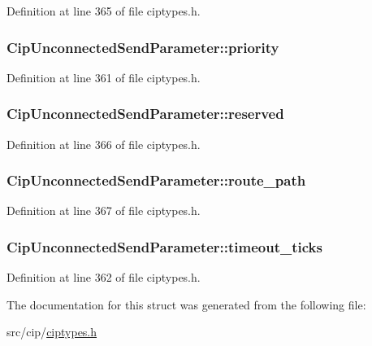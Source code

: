 \-Definition at line 365 of file ciptypes.\-h.

\hypertarget{structCipUnconnectedSendParameter_aea90d5467415fb3f6996449c87834b89}{
\subsubsection[{priority}]{ {\bf \-Cip\-Unconnected\-Send\-Parameter\-::priority}}}\label{de/dcb/structCipUnconnectedSendParameter_aea90d5467415fb3f6996449c87834b89}


\-Definition at line 361 of file ciptypes.\-h.

\hypertarget{structCipUnconnectedSendParameter_a7566c5068e1743451c3d7bf14ad6fa93}{
\subsubsection[{reserved}]{ {\bf \-Cip\-Unconnected\-Send\-Parameter\-::reserved}}}\label{de/dcb/structCipUnconnectedSendParameter_a7566c5068e1743451c3d7bf14ad6fa93}


\-Definition at line 366 of file ciptypes.\-h.

\hypertarget{structCipUnconnectedSendParameter_a4155f1bd663fd20f9ba78f2057e5fd34}{
\subsubsection[{route\-\_\-path}]{ {\bf \-Cip\-Unconnected\-Send\-Parameter\-::route\-\_\-path}}}\label{de/dcb/structCipUnconnectedSendParameter_a4155f1bd663fd20f9ba78f2057e5fd34}


\-Definition at line 367 of file ciptypes.\-h.

\hypertarget{structCipUnconnectedSendParameter_a832826bc7300063845b5170ee0abe486}{
\subsubsection[{timeout\-\_\-ticks}]{ {\bf \-Cip\-Unconnected\-Send\-Parameter\-::timeout\-\_\-ticks}}}\label{de/dcb/structCipUnconnectedSendParameter_a832826bc7300063845b5170ee0abe486}


\-Definition at line 362 of file ciptypes.\-h.



\-The documentation for this struct was generated from the following file\-:\begin{DoxyCompactItemize}
\item 
src/cip/\hyperlink{ciptypes_8h}{ciptypes.\-h}\end{DoxyCompactItemize}
